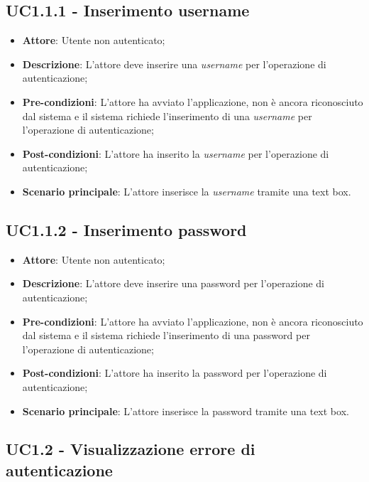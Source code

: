 \subsection{UC1.1.1 - Inserimento username}

\begin{itemize}
	\item \textbf{Attore}: Utente non autenticato;
	\item \textbf{Descrizione}: L'attore deve inserire una \textit{username} per l'operazione di autenticazione;
	\item \textbf{Pre-condizioni}: L'attore ha avviato l'applicazione, non è ancora riconosciuto dal sistema e il sistema richiede l'inserimento di una \textit{username} per l'operazione di autenticazione;
	\item \textbf{Post-condizioni}: L'attore ha inserito la \textit{username} per l'operazione di autenticazione;
	\item \textbf{Scenario principale}: L'attore inserisce la \textit{username} tramite una text box.
\end{itemize}

\subsection{UC1.1.2 - Inserimento password}

\begin{itemize}
	\item \textbf{Attore}: Utente non autenticato;
	\item \textbf{Descrizione}: L'attore deve inserire una password per l'operazione di autenticazione;
	\item \textbf{Pre-condizioni}: L'attore ha avviato l'applicazione, non è ancora riconosciuto dal sistema e il sistema richiede l'inserimento di una password per l'operazione di autenticazione;
	\item \textbf{Post-condizioni}: L'attore ha inserito la password per l'operazione di autenticazione;
	\item \textbf{Scenario principale}: L'attore inserisce la password tramite una text box.
\end{itemize}

\subsection{UC1.2 - Visualizzazione errore di autenticazione}

